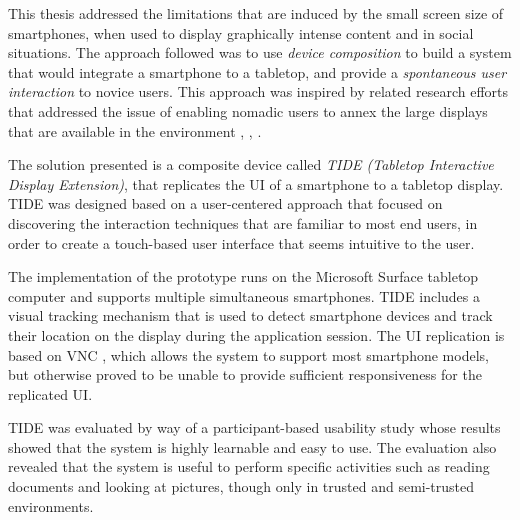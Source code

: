 This thesis addressed the limitations that are induced by the small screen size of smartphones, when used to display graphically intense content and in social situations.
The approach followed was to use \emph{device composition} to build a system that would integrate a smartphone to a tabletop, and provide a \emph{spontaneous user interaction} to novice users.
This approach was inspired by related research efforts that addressed the issue of enabling nomadic users to annex the large displays that are available in the environment \citep{Want:2002:personalserver}, \citep{Arthur:2011:xice}, \citep{Baur:2012:virtualprojection}.

The solution presented is a composite device called \emph{TIDE (Tabletop Interactive Display Extension)}, that replicates the UI of a smartphone to a tabletop display.
TIDE was designed based on a user-centered approach that focused on discovering the interaction techniques that are familiar to most end users, in order to create a touch-based user interface that seems intuitive to the user.

The implementation of the prototype runs on the Microsoft Surface tabletop computer and supports multiple simultaneous smartphones.
TIDE includes a visual tracking mechanism that is used to detect smartphone devices and track their location on the display during the application session.
The UI replication is based on VNC \citep{Richardson:1998:vnc}, which allows the system to support most smartphone models, but otherwise proved to be unable to provide sufficient responsiveness for the replicated UI.

TIDE was evaluated by way of a participant-based usability study whose results showed that the system is highly learnable and easy to use.
The evaluation also revealed that the system is useful to perform specific activities such as reading documents and looking at pictures, though only in trusted and semi-trusted environments.



